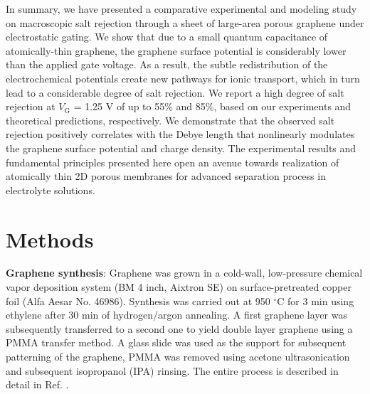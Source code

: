 \documentclass[journal=langd5,email=true, hyperref=true, keywords=false]{achemso}
\begin{document}
In summary, we have presented a comparative experimental and modeling
study on macroscopic salt rejection through a sheet of large-area
porous graphene under electrostatic gating. We show that due to a
small quantum capacitance of atomically-thin graphene, the graphene
surface potential is considerably lower than the applied gate
voltage. As a result, the subtle redistribution of the electrochemical
potentials create new pathways for ionic transport, which in turn lead
to a considerable degree of salt rejection. We report a high degree of
salt rejection at $V_{\mathrm{G}}$ = 1.25 V of up to 55\% and 85\%,
based on our experiments and theoretical predictions, respectively. We
demonstrate that the observed salt rejection positively correlates
with the Debye length that nonlinearly modulates the graphene surface
potential and charge density. The experimental results and fundamental
principles presented here open an avenue towards realization of
atomically thin 2D porous membranes for advanced separation process in
electrolyte solutions.

\section{Methods}
\label{sec:methods}

\textbf{Graphene synthesis}: Graphene was grown in a cold-wall,
low-pressure chemical vapor deposition system (BM 4 inch, Aixtron SE)
on surface-pretreated copper foil (Alfa Aesar No. 46986). Synthesis was
carried out at 950 $^{\circ}$C for 3 min using ethylene after 30 min of
hydrogen/argon annealing. A first graphene layer was subsequently
transferred to a second one to yield double layer graphene using a
PMMA transfer method. A glass slide was used as the support for
subsequent patterning of the graphene, PMMA was removed using acetone
ultrasonication and subsequent isopropanol (IPA) rinsing. The entire
process is described in detail in Ref. .
\end{document}

